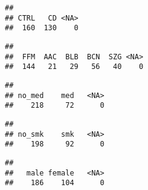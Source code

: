 \documentclass[
]{article}
\newenvironment{Shaded}{\begin{snugshade}}{\end{snugshade}}
\newcommand{\AttributeTok}[1]{\textcolor[rgb]{0.77,0.63,0.00}{#1}}
\newcommand{\FunctionTok}[1]{\textcolor[rgb]{0.00,0.00,0.00}{#1}}
\newcommand{\NormalTok}[1]{#1}
\newcommand{\SpecialCharTok}[1]{\textcolor[rgb]{0.00,0.00,0.00}{#1}}
\newcommand{\StringTok}[1]{\textcolor[rgb]{0.31,0.60,0.02}{#1}}
\begin{document}
\begin{verbatim}
## 
## CTRL   CD <NA> 
##  160  130    0
\end{verbatim}

\begin{Shaded}
\end{Shaded}

\begin{verbatim}
## 
##  FFM  AAC  BLB  BCN  SZG <NA> 
##  144   21   29   56   40    0
\end{verbatim}

\begin{Shaded}
\end{Shaded}

\begin{verbatim}
## 
## no_med    med   <NA> 
##    218     72      0
\end{verbatim}

\begin{Shaded}
\end{Shaded}

\begin{verbatim}
## 
## no_smk    smk   <NA> 
##    198     92      0
\end{verbatim}

\begin{Shaded}
\end{Shaded}

\begin{verbatim}
## 
##   male female   <NA> 
##    186    104      0
\end{verbatim}
\end{document}
